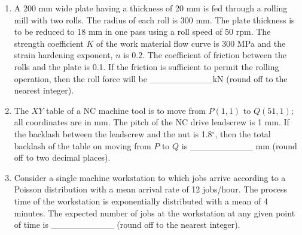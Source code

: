 \documentclass[journal,12pt,onecolumn]{IEEEtran}
\theoremstyle{remark}
\begin{document}
\begin{enumerate}
\item A 200 mm wide plate having a thickness of 20 mm is fed through a rolling mill with two rolls. The radius of each roll is 300 mm. The plate thickness is to be reduced to 18 mm in one pass using a roll speed of 50 rpm. The strength coefficient $ K $ of the work material flow curve is 300 MPa and the strain hardening exponent, $ n $ is 0.2. The coefficient of friction between the rolls and the plate is 0.1. If the friction is sufficient to permit the rolling operation, then the roll force will be \_\_\_\_\_\_\_\_\_\_kN (round off to the nearest integer).\\

\item The $ XY $ table of a NC machine tool is to move from $ P(1,1) $ to $ Q(51,1) $; all coordinates are in mm. The pitch of the NC drive leadscrew is 1 mm. If the backlash between the leadscrew and the nut is 1.8$ ^\circ $, then the total backlash of the table on moving from $ P $ to $ Q $ is \_\_\_\_\_\_\_\_\_\_ mm (round off to two decimal places).\\

\item Consider a single machine workstation to which jobs arrive according to a Poisson distribution with a mean arrival rate of 12 jobs/hour. The process time of the workstation is exponentially distributed with a mean of 4 minutes. The expected number of jobs at the workstation at any given point of time is \_\_\_\_\_\_\_\_\_\_ (round off to the nearest integer).


\end{enumerate}
\end{document}
